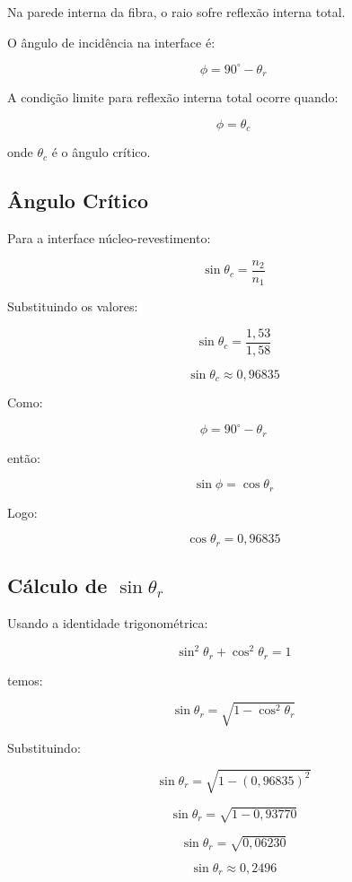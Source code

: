 \documentclass[12pt,a4paper]{article}
\begin{document}
Na parede interna da fibra, o raio sofre reflexão interna total.

O ângulo de incidência na interface é:

\[
\phi = 90^\circ - \theta_r
\]

A condição limite para reflexão interna total ocorre quando:

\[
\phi = \theta_c
\]

onde $\theta_c$ é o ângulo crítico.


\subsection*{Ângulo Crítico}

Para a interface núcleo-revestimento:

\[
\sin\theta_c = \frac{n_2}{n_1}
\]

Substituindo os valores:

\[
\sin\theta_c =
\frac{1,53}{1,58}
\]

\[
\sin\theta_c \approx 0,96835
\]

Como:

\[
\phi = 90^\circ - \theta_r
\]

então:

\[
\sin\phi = \cos\theta_r
\]

Logo:

\[
\cos\theta_r = 0,96835
\]


\subsection*{Cálculo de \texorpdfstring{$\sin\theta_r$}{sen(theta r)}}

Usando a identidade trigonométrica:

\[
\sin^2\theta_r + \cos^2\theta_r = 1
\]

temos:

\[
\sin\theta_r =
\sqrt{1 - \cos^2\theta_r}
\]

Substituindo:

\[
\sin\theta_r =
\sqrt{1 - (0,96835)^2}
\]

\[
\sin\theta_r =
\sqrt{1 - 0,93770}
\]

\[
\sin\theta_r =
\sqrt{0,06230}
\]

\[
\sin\theta_r \approx 0,2496
\]
\end{document}
